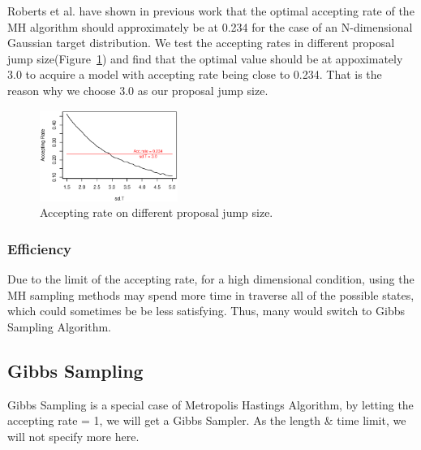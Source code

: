 Roberts et al. have shown in previous work\cite{roberts1997weak} that the optimal accepting rate of the MH algorithm should approximately be at 0.234 for the case of an N-dimensional Gaussian target distribution. We test the accepting rates in different proposal jump size(Figure~\ref{fig:acc_sdt}) and find that the optimal value should be at appoximately 3.0 to acquire a model with accepting rate being close to 0.234. That is the reason why we choose 3.0 as our proposal jump size.

\begin{figure}[tb]
  	\centering
  	\includegraphics[width=0.4\textwidth]{figure/acc_sdt.eps}
	\caption{Accepting rate on different proposal jump size.}
	\label{fig:acc_sdt}
\end{figure}

\subsubsection{Efficiency}
Due to the limit of the accepting rate, for a high dimensional condition, using the MH sampling methods may spend more time in traverse all of the possible states, which could sometimes be be less satisfying. Thus, many would switch to Gibbs Sampling Algorithm.

\subsection{Gibbs Sampling}
Gibbs Sampling is a special case of Metropolis Hastings Algorithm, by letting the accepting rate = 1, we will get a Gibbs Sampler. As the length \& time limit, we will not specify more here.






